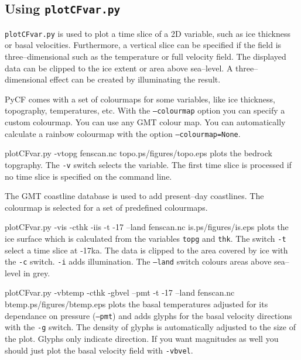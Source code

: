 \subsection{Using \texttt{plotCFvar.py}}
\texttt{plotCFvar.py} is used to plot a time slice of a 2D variable, such as ice thickness or basal velocities. Furthermore, a vertical slice can be specified if the field is three--dimensional such as the temperature or full velocity field. The displayed data can be clipped to the ice extent or area above sea--level. A three--dimensional effect can be created by illuminating the result.

PyCF comes with a set of colourmaps for some variables, like ice thickness, topography, temperatures, etc. With the \texttt{--colourmap} option you can specify a custom colourmap. You can use any GMT colour map. You can automatically calculate a rainbow colourmap with the option \texttt{--colourmap=None}.

\begin{pycf}{plotCFvar.py -vtopg fenscan.nc topo.ps}{\dir/figures/topo.eps}
plots the bedrock topgraphy. The \texttt{-v} switch selects the variable. The first time slice is processed if no time slice is specified on the command line. 

The GMT coastline database is used to add present--day coastlines. The colourmap is selected for a set of predefined colourmaps.
\end{pycf}

\begin{pycf}{plotCFvar.py -vis -cthk -iis -t -17 --land fenscan.nc is.ps}{\dir/figures/is.eps}
plots the ice surface which is calculated from the variables \texttt{topg} and \texttt{thk}. The switch \texttt{-t} select a time slice at -17ka. The data is clipped to the area covered by ice with the \texttt{-c} switch. \texttt{-i} adds illumination. The \texttt{--land} switch colours areas above sea--level in grey.
\end{pycf}

\begin{pycf}{plotCFvar.py -vbtemp -cthk -gbvel --pmt -t -17 --land fenscan.nc btemp.ps}{\dir/figures/btemp.eps}
plots the basal temperatures adjusted for its dependance on pressure (\texttt{--pmt}) and adds glyphs for the basal velocity directions with the \texttt{-g} switch. The density of glyphs is automatically adjusted to the size of the plot. Glyphs only indicate direction. If you want magnitudes as well you should just plot the basal velocity field with \texttt{-vbvel}.
\end{pycf}

